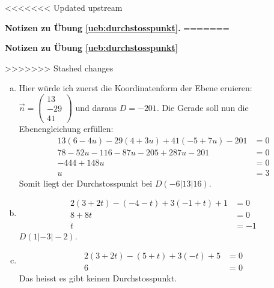 \documentclass[%
11pt,%
twoside,%
titlepage,%
<<<<<<< Updated upstream
german,%
=======
swissgerman,%
>>>>>>> Stashed changes
headsepline%
]{scrartcl}
\newcommand{\faReturnGray}{\textcolor{gray}{\faMailReply}} %
\theoremstyle{definition}
\theoremstyle{plain}
\newcommand{\concatueb}[1]{ueb:#1}%
\newcommand{\concatlsg}[1]{lsg:#1}%
\newenvironment{lsg}[1]{%
<<<<<<< Updated upstream
    \par\noindent\textbf{Notizen zu Übung \ref{\concatueb{#1}}.}%
    \label{\concatlsg{#1}}
=======
    \par\noindent\textbf{Notizen zu Übung \ref{\concatueb{#1}}}\label{\concatlsg{#1}}
    \hfill\hyperref[\concatueb{#1}]{\faReturnGray}\par %
>>>>>>> Stashed changes
}{%
    \par%
}
\begin{document}
\begin{lsg}{durchstosspunkt}
\begin{enumerate}[a)]
    \item Hier würde ich zuerst die Koordinatenform der Ebene eruieren: $\vec{n}=\begin{pmatrix}
        13\\-29\\41
    \end{pmatrix}$ und daraus $D=-201$. Die Gerade soll nun die Ebenengleichung erfüllen:
    \begin{align*}
        13(6-4u)-29(4+3u)+41(-5+7u)-201 &= 0\\
        78-52u-116-87u-205+287u-201 &= 0\\
        -444+148u &= 0\\
        u &= 3
    \end{align*}
    Somit liegt der Durchstosspunkt bei $D(-6|13|16)$.

    \item \begin{align*}
        2(3+2t)-(-4-t)+3(-1+t)+1 &= 0\\
        8+8t &= 0\\
        t &= -1
    \end{align*}
    $D(1|-3|-2)$.

    \item \begin{align*}
        2(3+2t)-(5+t)+3(-t)+5 &= 0\\
        6 &= 0
    \end{align*}
    Das heisst es gibt keinen Durchstosspunkt.
\end{enumerate}
\end{lsg}
\end{document}
